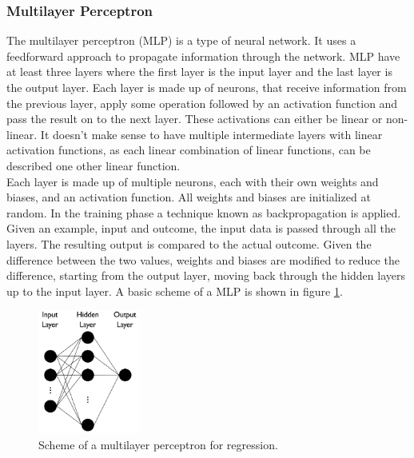 \subsubsection{Multilayer Perceptron}
The multilayer perceptron (MLP) is a type of neural network. It uses a feedforward approach to propagate information through the network. MLP have at least three layers where the first layer is the input layer and the last layer is the output layer. Each layer is made up of neurons, that receive information from the previous layer, apply some operation followed by an activation function and pass the result on to the next layer. These activations can either be linear or non-linear. It doesn't make sense to have multiple intermediate layers with linear activation functions, as each linear combination of linear functions, can be described one other linear function. \\
Each layer is made up of multiple neurons, each with their own weights and biases, and an activation function. All weights and biases are initialized at random. In the training phase a technique known as backpropagation is applied. Given an example, input and outcome, the input data is passed through all the layers. The resulting output is compared to the actual outcome. Given the difference between the two values, weights and biases are modified to reduce the difference, starting from the output layer, moving back through the hidden layers up to the input layer. A basic scheme of a MLP is shown in figure \ref{fig:mlpdiag}.

\begin{figure}[h]
\centering
\includegraphics[width=0.3\textwidth]{figures/mlpdiag}
\caption{Scheme of a multilayer perceptron for regression.}
\label{fig:mlpdiag}
\end{figure}


